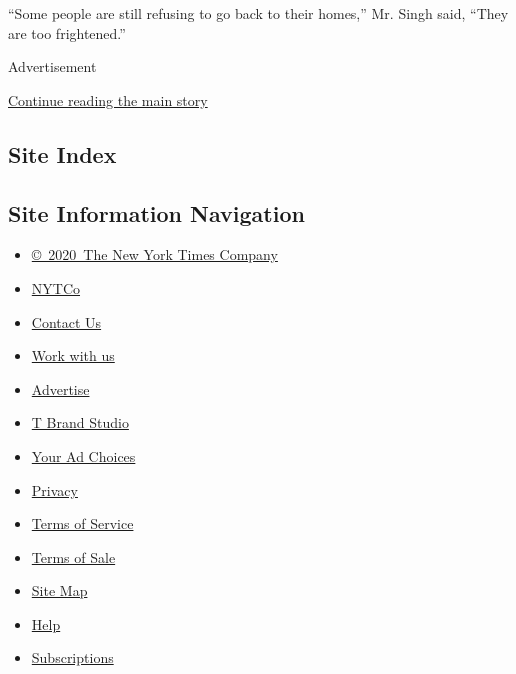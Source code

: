 ``Some people are still refusing to go back to their homes,'' Mr. Singh
said, ``They are too frightened.''

Advertisement

\protect\hyperlink{after-bottom}{Continue reading the main story}

\hypertarget{site-index}{%
\subsection{Site Index}\label{site-index}}

\hypertarget{site-information-navigation}{%
\subsection{Site Information
Navigation}\label{site-information-navigation}}

\begin{itemize}
\tightlist
\item
  \href{https://help.nytimes.com/hc/en-us/articles/115014792127-Copyright-notice}{©~2020~The
  New York Times Company}
\end{itemize}

\begin{itemize}
\tightlist
\item
  \href{https://www.nytco.com/}{NYTCo}
\item
  \href{https://help.nytimes.com/hc/en-us/articles/115015385887-Contact-Us}{Contact
  Us}
\item
  \href{https://www.nytco.com/careers/}{Work with us}
\item
  \href{https://nytmediakit.com/}{Advertise}
\item
  \href{http://www.tbrandstudio.com/}{T Brand Studio}
\item
  \href{https://www.nytimes.com/privacy/cookie-policy\#how-do-i-manage-trackers}{Your
  Ad Choices}
\item
  \href{https://www.nytimes.com/privacy}{Privacy}
\item
  \href{https://help.nytimes.com/hc/en-us/articles/115014893428-Terms-of-service}{Terms
  of Service}
\item
  \href{https://help.nytimes.com/hc/en-us/articles/115014893968-Terms-of-sale}{Terms
  of Sale}
\item
  \href{https://spiderbites.nytimes.com}{Site Map}
\item
  \href{https://help.nytimes.com/hc/en-us}{Help}
\item
  \href{https://www.nytimes.com/subscription?campaignId=37WXW}{Subscriptions}
\end{itemize}
